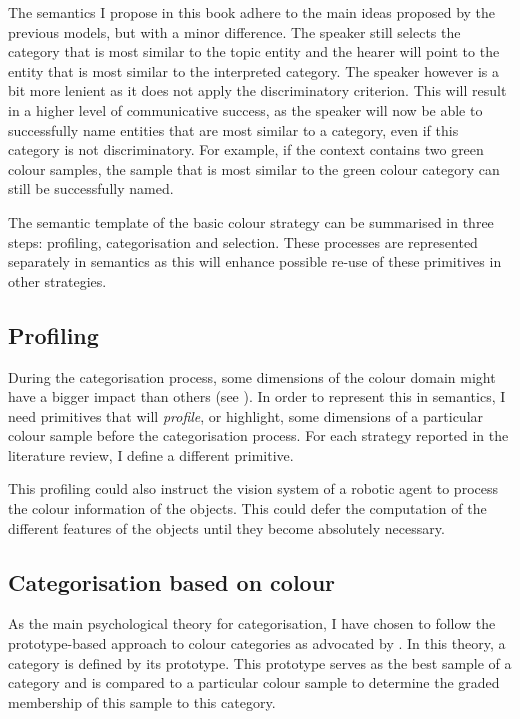 The semantics I propose in this book adhere to the main ideas
proposed by the previous models, but with a minor difference. The
speaker still selects the category that is most similar to the topic
entity and the hearer will point to the entity that is most similar to
the interpreted category. The speaker however is a bit more lenient as
it does not apply the discriminatory criterion. This will result in a
higher level of communicative success, as the speaker will now be able
to successfully name entities that are most similar to a category,
even if this category is not discriminatory. For example, if the
context contains two green colour samples, the sample that is most
similar to the green colour category can still be successfully
named. 

The semantic template of the basic colour strategy can be
summarised in three steps: profiling, categorisation and
selection. These processes are represented separately in semantics as
this will enhance possible re-use of these primitives in other
strategies.

\subsection{Profiling}

During the categorisation process, some dimensions of the colour
domain might have a bigger impact than others (see ). In order to represent this in
semantics, I need primitives that will \emph{profile}, or highlight,
some dimensions of a particular colour sample before the
categorisation process. For each strategy reported in the literature
review, I define a different primitive.

This profiling could also instruct the vision system of a robotic
agent to process the colour information of the objects. This could
defer the computation of the different features of the objects until
they become absolutely necessary.

\subsection{Categorisation based on colour}
\label{s:bcs-categorisation}

As the main psychological theory for categorisation, I have chosen to
follow the prototype-based approach to colour categories as advocated
by \cite{rosch73natural}. In this theory, a category is defined by its
prototype. This prototype serves as the best sample of a category and
is compared to a particular colour sample to determine the graded
membership of this sample to this category.

